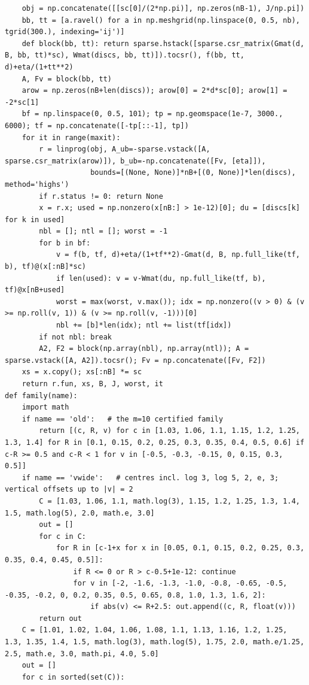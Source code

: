 \documentclass[11pt,reqno]{amsart}
\numberwithin{equation}{section}
\theoremstyle{definition}
\theoremstyle{remark}
\begin{document}
\begin{lstlisting}
    obj = np.concatenate([[sc[0]/(2*np.pi)], np.zeros(nB-1), J/np.pi])
    bb, tt = [a.ravel() for a in np.meshgrid(np.linspace(0, 0.5, nb), tgrid(300.), indexing='ij')]
    def block(bb, tt): return sparse.hstack([sparse.csr_matrix(Gmat(d, B, bb, tt)*sc), Wmat(discs, bb, tt)]).tocsr(), f(bb, tt, d)+eta/(1+tt**2)
    A, Fv = block(bb, tt)
    arow = np.zeros(nB+len(discs)); arow[0] = 2*d*sc[0]; arow[1] = -2*sc[1]
    bf = np.linspace(0, 0.5, 101); tp = np.geomspace(1e-7, 3000., 6000); tf = np.concatenate([-tp[::-1], tp])
    for it in range(maxit):
        r = linprog(obj, A_ub=-sparse.vstack([A, sparse.csr_matrix(arow)]), b_ub=-np.concatenate([Fv, [eta]]),
                    bounds=[(None, None)]*nB+[(0, None)]*len(discs), method='highs')
        if r.status != 0: return None
        x = r.x; used = np.nonzero(x[nB:] > 1e-12)[0]; du = [discs[k] for k in used]
        nbl = []; ntl = []; worst = -1
        for b in bf:
            v = f(b, tf, d)+eta/(1+tf**2)-Gmat(d, B, np.full_like(tf, b), tf)@(x[:nB]*sc)
            if len(used): v = v-Wmat(du, np.full_like(tf, b), tf)@x[nB+used]
            worst = max(worst, v.max()); idx = np.nonzero((v > 0) & (v >= np.roll(v, 1)) & (v >= np.roll(v, -1)))[0]
            nbl += [b]*len(idx); ntl += list(tf[idx])
        if not nbl: break
        A2, F2 = block(np.array(nbl), np.array(ntl)); A = sparse.vstack([A, A2]).tocsr(); Fv = np.concatenate([Fv, F2])
    xs = x.copy(); xs[:nB] *= sc
    return r.fun, xs, B, J, worst, it
def family(name):
    import math
    if name == 'old':   # the m=10 certified family
        return [(c, R, v) for c in [1.03, 1.06, 1.1, 1.15, 1.2, 1.25, 1.3, 1.4] for R in [0.1, 0.15, 0.2, 0.25, 0.3, 0.35, 0.4, 0.5, 0.6] if c-R >= 0.5 and c-R < 1 for v in [-0.5, -0.3, -0.15, 0, 0.15, 0.3, 0.5]]
    if name == 'vwide':   # centres incl. log 3, log 5, 2, e, 3; vertical offsets up to |v| = 2
        C = [1.03, 1.06, 1.1, math.log(3), 1.15, 1.2, 1.25, 1.3, 1.4, 1.5, math.log(5), 2.0, math.e, 3.0]
        out = []
        for c in C:
            for R in [c-1+x for x in [0.05, 0.1, 0.15, 0.2, 0.25, 0.3, 0.35, 0.4, 0.45, 0.5]]:
                if R <= 0 or R > c-0.5+1e-12: continue
                for v in [-2, -1.6, -1.3, -1.0, -0.8, -0.65, -0.5, -0.35, -0.2, 0, 0.2, 0.35, 0.5, 0.65, 0.8, 1.0, 1.3, 1.6, 2]:
                    if abs(v) <= R+2.5: out.append((c, R, float(v)))
        return out
    C = [1.01, 1.02, 1.04, 1.06, 1.08, 1.1, 1.13, 1.16, 1.2, 1.25, 1.3, 1.35, 1.4, 1.5, math.log(3), math.log(5), 1.75, 2.0, math.e/1.25, 2.5, math.e, 3.0, math.pi, 4.0, 5.0]
    out = []
    for c in sorted(set(C)):

\end{lstlisting}
\end{document}
